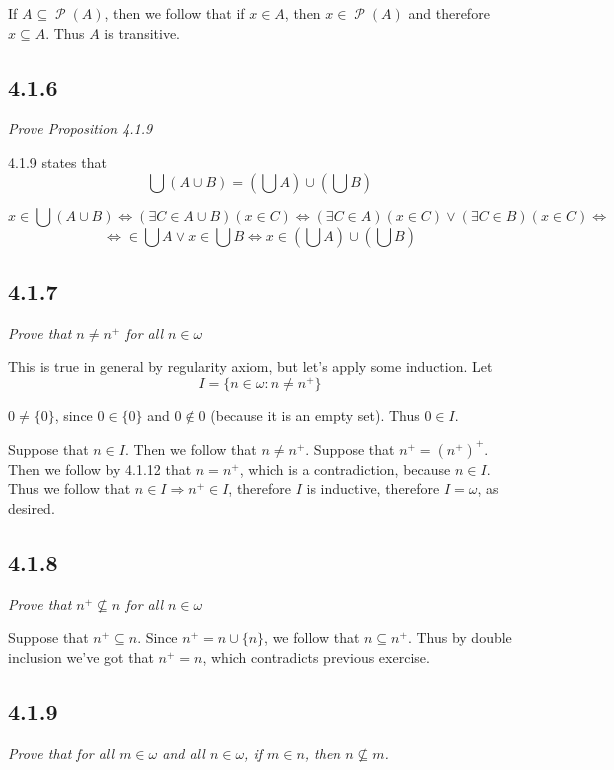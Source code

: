 \documentclass[11pt,oneside,titlepage]{book}
\DeclareMathOperator \pow {\mathcal {P}}
\DeclareMathOperator \lra {\Leftrightarrow}
\DeclareMathOperator \ra {\Rightarrow}
\begin{document}
If $A \subseteq \pow(A)$, then we follow that if $x \in A$, then $x \in \pow(A)$ and therefore
$x \subseteq A$. Thus $A$ is transitive.


\subsection*{4.1.6}

\textit{Prove Proposition 4.1.9}

4.1.9 states that
$$\bigcup(A \cup B) = (\bigcup A) \cup (\bigcup B)$$

$$x \in \bigcup(A \cup B) \lra (\exists C \in A \cup B)(x \in C) \lra
(\exists C \in A)(x \in C) \lor (\exists C \in B)(x \in C) \lra$$
$$ \lra \in \bigcup A \lor x \in \bigcup B \lra x \in (\bigcup A) \cup (\bigcup B)$$


\subsection*{4.1.7}

\textit{Prove that $n \neq n^+$ for all $n \in \omega$}

This is true in general by regularity axiom, but let's apply some induction.
Let
$$I =  \{n \in \omega: n \neq n^+\}$$

$0 \neq \{0\}$, since $0 \in  \{0\}$ and $0 \notin 0$ (because it is an empty set). Thus $0 \in I$.

Suppose that $n \in I$. Then we follow that $n \neq n^+$.
Suppose that $n^+ = (n^+)^+$. Then we follow by 4.1.12 that $n = n^+$, which is a contradiction,
because $n \in I$. Thus we follow that $n \in I \ra n^+ \in I$, therefore $I$ is inductive,
therefore $I = \omega$, as desired.


\subsection*{4.1.8}

\textit{Prove that $n^+ \not \subseteq n$ for all $n \in \omega$}

Suppose that $n^+ \subseteq n$. Since $n^+ = n \cup \{n\}$, we follow that $n \subseteq n^+$.
Thus by double inclusion we've got that $n^+ = n$, which contradicts previous exercise.


\subsection*{4.1.9}

\textit{Prove that for all $m \in \omega$ and all $n \in \omega$, if $m \in n$, then
  $n \not \subseteq m$.}
\end{document}
